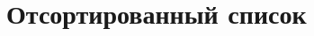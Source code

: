 \documentclass{article}
\begin{document}
\section{Отсортированный список}

\printglossary[title={Список},type=\glsdefaulttype]
\end{document}
